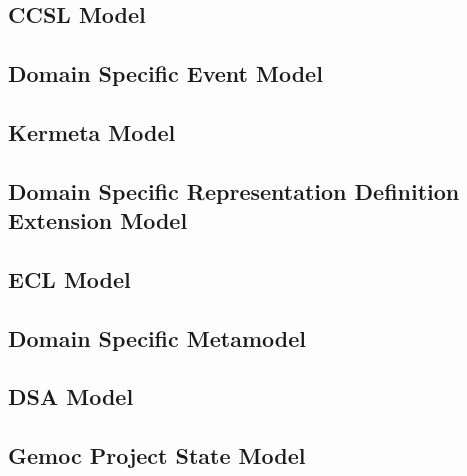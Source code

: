 \documentclass{gemoc} %
\begin{document}

\subsection{CCSL Model}


\subsection{Domain Specific Event Model}


\subsection{Kermeta Model}


\subsection{Domain Specific Representation Definition Extension Model}


\subsection{ECL Model}


\subsection{Domain Specific Metamodel}


\subsection{DSA Model}


\subsection{Gemoc Project State Model}
\end{document}
